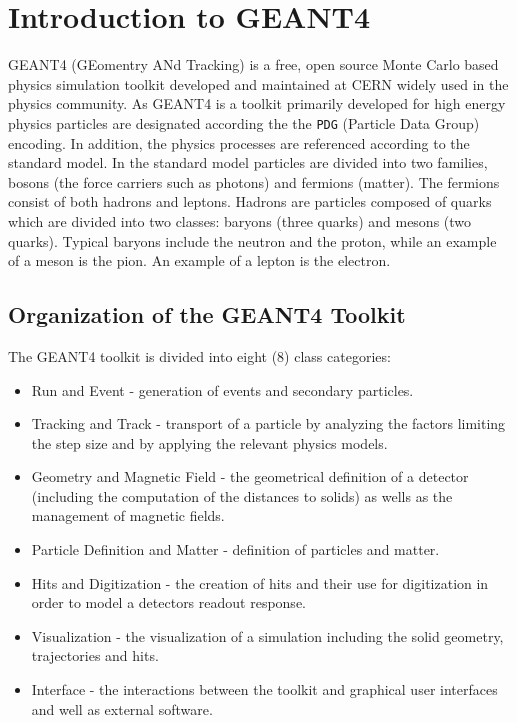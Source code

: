 \section{Introduction to GEANT4}
\label{sec:G4Intro}

GEANT4 (GEomentry ANd Tracking) is a free, open source Monte Carlo based physics simulation toolkit developed and maintained at CERN widely used in the physics community.
As GEANT4 is a toolkit primarily developed for high energy physics particles are designated according the the \verb+PDG+ (Particle Data Group) encoding.
In addition, the physics processes are referenced according to the standard model.
In the standard model particles are divided into two families, bosons (the force carriers such as photons) and fermions (matter).
The fermions consist of both hadrons and leptons.
Hadrons are particles composed of quarks which are divided into two classes: baryons (three quarks) and mesons (two quarks).
Typical baryons include the neutron and the proton, while an example of a meson is the pion.
An example of a lepton is the electron.
\subsection{Organization of the GEANT4 Toolkit}
The GEANT4 toolkit is divided into eight (8) class categories:
\begin{itemize}
    \item Run and Event - generation of events and secondary particles.
    \item Tracking and Track - transport of a particle by analyzing the factors limiting the step size and by applying the relevant physics models.
    \item Geometry and Magnetic Field - the geometrical definition of a detector (including the computation of the distances to solids) as wells as the management of magnetic fields.
    \item Particle Definition and Matter - definition of particles and matter.
    \item Hits and Digitization - the creation of hits and their use for digitization in order to model a detectors readout response.
    \item Visualization - the visualization of a simulation including the solid geometry, trajectories and hits.
    \item Interface - the interactions between the toolkit and graphical user interfaces and well as external software.
\end{itemize}

